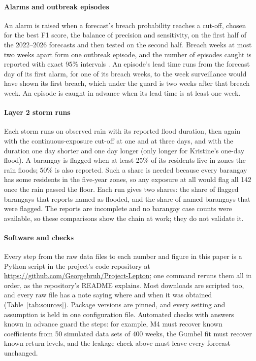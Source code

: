 \paragraph{Alarms and outbreak episodes}
An alarm is raised when a forecast's breach probability reaches a cut-off, chosen for the best F1
score, the balance of precision and sensitivity, on the first half of the 2022--2026 forecasts and
then tested on the second half. Breach weeks at most two weeks apart form one outbreak episode, and
the number of episodes caught is reported with exact 95\% intervals \parencite{clopper1934}. An
episode's lead time runs from the forecast day of its first alarm, for one of its breach weeks, to
the week surveillance would have shown its first breach, which under the guard is two weeks after
that breach week. An episode is caught in advance when its lead time is at least one week.

\paragraph{Layer 2 storm runs}
Each storm runs on observed rain with its reported flood duration, then again with the
continuous-exposure cut-off at one and at three days, and with the duration one day shorter and
one day longer (only longer for Kristine's one-day flood). A barangay is flagged when at least 25\% of its residents live in zones the rain
floods; 50\% is also reported. Such a share is needed because every barangay has some residents
in the five-year zones, so any exposure at all would flag all 142 once the rain passed the floor.
Each run gives two shares: the
share of flagged barangays that reports named as flooded, and the share of named barangays that
were flagged. The reports are incomplete and no barangay case counts were available, so these
comparisons show the chain at work; they do not validate it.

\paragraph{Software and checks}
Every step from the raw data files to each number and figure in this paper is a Python script in
the project's code repository at %
{\def\UrlBreaks{\do\/}\url{https://github.com/Georgebruh/Project-Lepton}}; one command
reruns them all in order, as the repository's README explains. Most downloads are
scripted too, and every raw file
has a note saying where and when it was obtained (Table~\ref{tab:sources}). Package versions are pinned, and every setting
and assumption is held in one configuration file. Automated checks with answers known in advance guard
the steps: for example, M4 must recover known coefficients from 50 simulated data sets of 400
weeks, the Gumbel fit must recover known return levels, and the leakage check above must leave
every forecast unchanged.
